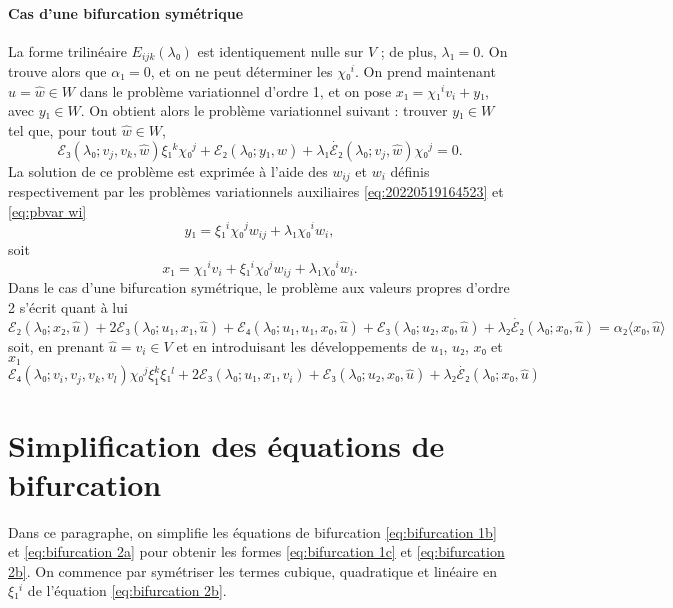\documentclass[12pt, final]{amsart}
\theoremstyle{definition}
\begin{document}
\paragraph{Cas d'une bifurcation symétrique}La forme trilinéaire \(E_{i j k}(λ₀)\) est identiquement nulle sur \(V\) ; de plus, \(λ₁ = 0\). On trouve alors que \(α₁ = 0\), et on ne peut déterminer les \(χ₀^i\). On prend maintenant \(\hat{u} = \hat{w}∈W\) dans le problème variationnel d'ordre 1, et on pose \(x₁ = χ₁^i v_i + y₁\), avec \(y₁∈W\). On obtient alors le problème variationnel suivant : trouver \(y₁∈W\) tel que, pour tout \(\hat{w}∈W\),
\begin{equation} ℰ₃(λ₀ ; v_j, v_k, \hat{w}) ξ₁^k χ₀^j
  +ℰ₂(λ₀ ; y₁, \hat{w}) + λ₁ \dot{ℰ₂}
 (λ₀ ; v_j, \hat{w}) χ₀^j = 0. \end{equation}
La solution de ce problème est exprimée à l'aide des \(w_{i j}\) et \(w_i\) définis respectivement par les problèmes variationnels auxiliaires \eqref{eq:20220519164523} et \eqref{eq:pbvar wi}
\begin{equation} y₁ = ξ₁^i χ₀^j w_{i j} + λ₁ χ₀^i w_i, \end{equation}
soit
\begin{equation} x₁ = χ₁^i v_i + ξ₁^i χ₀^j w_{i j} + λ₁ χ₀^i
  w_i . \end{equation}
Dans le cas d'une bifurcation symétrique, le problème aux valeurs propres d'ordre 2 s'écrit quant à lui
\begin{equation} ℰ₂(λ₀ ; x₂, \hat{u}) + 2ℰ₃(λ₀ ; u₁,
  x₁, \hat{u}) +ℰ₄ (λ₀ ; u₁, u₁, x₀, \hat{u})
  +ℰ₃(λ₀ ; u₂, x₀, \hat{u}) + λ₂
  \dot{ℰ₂}(λ₀ ; x₀, \hat{u}) = α₂ 〈 x₀,
  \hat{u} 〉 \end{equation}
soit, en prenant \(\hat{u} = \widehat{v_i}∈V\) et en introduisant les développements de \(u₁\), \(u₂\), \(x₀ \) et \(x₁\)
\begin{equation} ℰ₄ (λ₀ ; v_i, v_j, v_k, v_l) χ₀^j ξ_{1 }^k ξ₁^l
  + 2ℰ₃(λ₀ ; u₁, x₁, v_i) +ℰ₃(λ₀ ;
  u₂, x₀, \hat{u}) + λ₂ \dot{ℰ₂}(λ₀ ; x₀,
  \hat{u}) \end{equation}
\section{Simplification des équations de
bifurcation}\label{sec:Simplification des équations de bifurcation}

Dans ce paragraphe, on simplifie les équations de bifurcation \eqref{eq:bifurcation 1b} et \eqref{eq:bifurcation 2a} pour obtenir les formes \eqref{eq:bifurcation 1c} et \eqref{eq:bifurcation 2b}. On commence par symétriser les termes cubique, quadratique et linéaire en \(ξ₁^i\) de
l'équation \eqref{eq:bifurcation 2b}.
\end{document}
